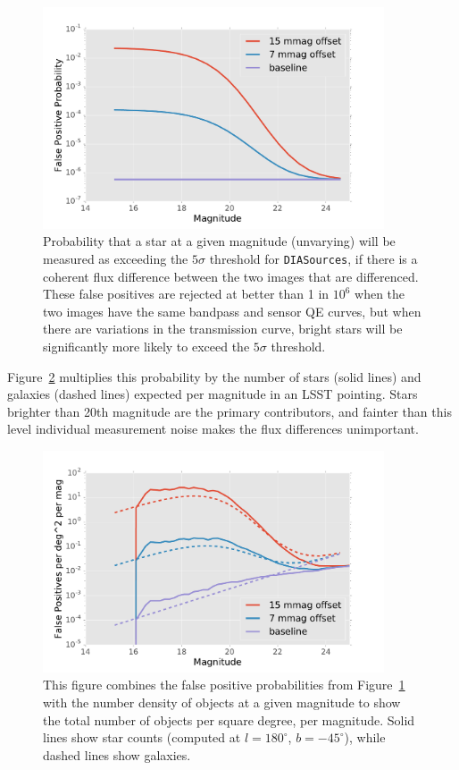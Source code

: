 \documentclass[12pt]{article}
\newcommand{\code}[1]{\texttt{#1}}
\newcommand{\DIASources}{\code{DIASources}\xspace}
\begin{document}
\begin{figure}
\includegraphics[width=0.9\textwidth]{figures/false_positive_prob.pdf}
\caption{Probability that a star at a given magnitude (unvarying) will be
measured as exceeding the $5\sigma$ threshold for \DIASources, if there is a
coherent flux difference between the two images that are differenced. These
false positives are rejected at better than 1 in $10^6$ when the two images have
the same bandpass and sensor QE curves, but when there are variations in the
transmission curve, bright stars will be significantly more likely to exceed the
$5\sigma$ threshold.
\label{fig:false_positive_prob}}
\end{figure}

Figure~\ref{fig:false_positive_differential} multiplies this probability by the
number of stars (solid lines) and galaxies (dashed lines) expected per magnitude
in an LSST pointing. Stars brighter than 20th magnitude are the primary
contributors, and fainter than this level individual measurement noise makes the
flux differences unimportant.

\begin{figure}
\includegraphics[width=0.9\textwidth]{figures/false_positive_differential.pdf}
\caption{This figure combines the false positive probabilities from
Figure~\ref{fig:false_positive_prob} with the number density of objects at a
given magnitude to show the total number of objects per square degree, per magnitude.
Solid lines show star counts (computed at $l=180^\circ$, $b=-45^\circ$), while
dashed lines show galaxies.
\label{fig:false_positive_differential}}
\end{figure}
\end{document}
